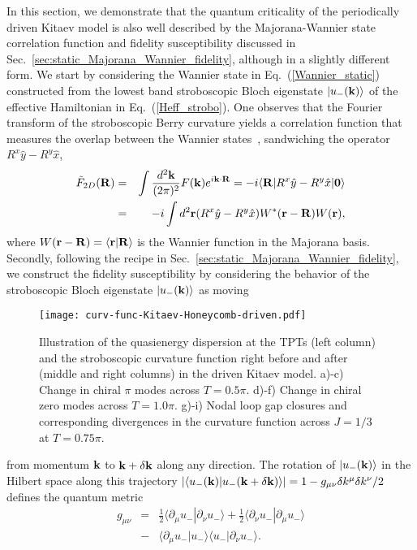 \documentclass[aps,prb,twocolumn,superscriptaddress,groupedaddress]{revtex4}
\begin{document}
In this section, we demonstrate that the quantum criticality of the periodically driven Kitaev model is also well described by the Majorana-Wannier state correlation function and fidelity susceptibility discussed in Sec.~\ref{sec:static_Majorana_Wannier_fidelity}, although in a slightly different form. 
We start by considering the Wannier state in Eq.~(\ref{Wannier_static}) constructed from the lowest band stroboscopic Bloch eigenstate $|u_{-}({\bf k})\rangle$ of the effective Hamiltonian in Eq.~(\ref{Heff_strobo}).
One observes that the Fourier transform of the stroboscopic Berry curvature yields a correlation function that measures the overlap between the Wannier states~\cite{Wang06,Marzari12,Gradhand12,Chen:2017,Chen-Sigrist-book:2019,Chen-Schnyder:2019}, sandwiching the operator $R^{x}\hat{y}-R^{y}{\hat x}$,
\begin{eqnarray}
\tilde{F}_{2D}({\bf R})&=&\int\frac{d^{2}{\bf k}}{(2\pi)^{2}}F({\bf k})e^{i{\bf k\cdot R}}=-i\langle{\bf R}|R^{x}\hat{y}-R^{y}{\hat x}|{\bf 0}\rangle
\nonumber \\
&=&-i\int d^{2}{\bf r}(R^{x}\hat{y}-R^{y}{\hat x})W^{\ast}({\bf r-R})W({\bf r}),
\label{Majorana_Wannier_corr_driven}
\end{eqnarray}
where $W({\bf r-R})=\langle{\bf r}|{\bf R}\rangle$ is the Wannier function in the Majorana basis. Secondly, following the recipe in Sec.~\ref{sec:static_Majorana_Wannier_fidelity}, we construct the fidelity susceptibility by considering the behavior of the stroboscopic Bloch eigenstate $|u_{-}({\bf k})\rangle$ as moving 
\newpage

\onecolumngrid

\begin{figure}
\centering
\texttt{[image: curv-func-Kitaev-Honeycomb-driven.pdf]}
\caption{Illustration of the quasienergy dispersion at the TPTs (left column) and the stroboscopic curvature function right before and after (middle and right columns) in the driven Kitaev model.
a)-c) Change in chiral $\pi$ modes across $T=0.5\pi$.
d)-f) Change in chiral zero modes across $T=1.0\pi$.
g)-i) Nodal loop gap closures and corresponding divergences in the curvature function across $J=1/3$ at $T=0.75\pi$.}
\label{fig:curv-func-Kitaev-honeycomb-driven}
\end{figure}

\twocolumngrid

\noindent
from momentum ${\bf k}$ to ${\bf k}+\delta{\bf k}$ along any direction. The rotation of $|u_{-}({\bf k})\rangle$ in the Hilbert space along this trajectory $|\langle u_{-}({\bf k})|u_{-}({\bf k}+\delta{\bf k})\rangle|=1-g_{\mu\nu}\delta k^{\mu}\delta k^{\nu}/2$
defines the quantum metric 
%
\begin{eqnarray}
g_{\mu\nu}&=&\frac{1}{2}\langle\partial_{\mu}u_{-}|\partial_{\nu}u_{-}\rangle
+\frac{1}{2}\langle\partial_{\nu}u_{-}|\partial_{\mu}u_{-}\rangle
\nonumber \\
&-&\langle\partial_{\mu}u_{-}|u_{-}\rangle\langle u_{-}|\partial_{\nu}u_{-}\rangle.
\end{eqnarray}
%
\end{document}
